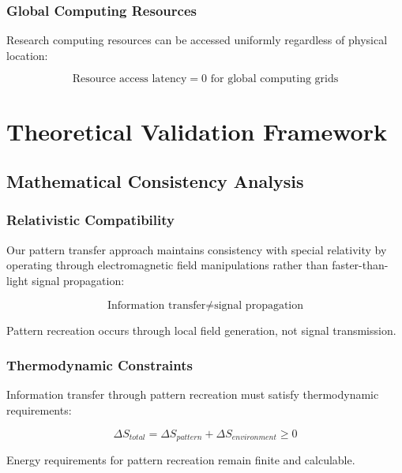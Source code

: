 \documentclass[12pt,a4paper]{article}
\begin{document}
\subsubsection{Global Computing Resources}

Research computing resources can be accessed uniformly regardless of physical location:

\begin{equation}
\text{Resource access latency} = 0 \text{ for global computing grids}
\label{eq:instant_resource_access}
\end{equation}

\section{Theoretical Validation Framework}

\subsection{Mathematical Consistency Analysis}

\subsubsection{Relativistic Compatibility}

Our pattern transfer approach maintains consistency with special relativity by operating through electromagnetic field manipulations rather than faster-than-light signal propagation:

\begin{equation}
\text{Information transfer} \neq \text{signal propagation}
\label{eq:transfer_vs_propagation}
\end{equation}

Pattern recreation occurs through local field generation, not signal transmission.

\subsubsection{Thermodynamic Constraints}

Information transfer through pattern recreation must satisfy thermodynamic requirements:

\begin{equation}
\Delta S_{total} = \Delta S_{pattern} + \Delta S_{environment} \geq 0
\label{eq:thermodynamic_constraint}
\end{equation}

Energy requirements for pattern recreation remain finite and calculable.
\end{document}
